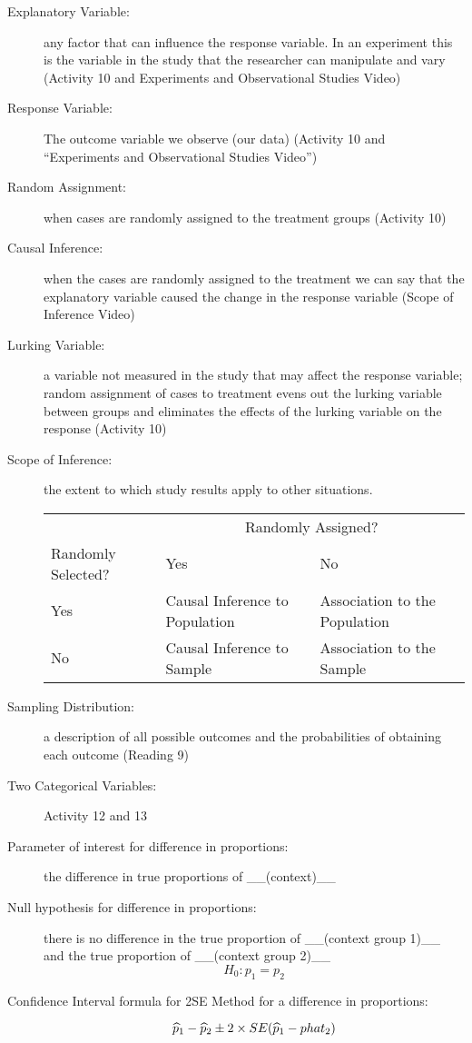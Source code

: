 \begin{description}
\item [Explanatory Variable:] any factor that can influence the
  response variable.  In an experiment this is the variable in the
  study that the researcher can manipulate and vary (Activity 10 and
  Experiments and Observational Studies Video)
\item [Response Variable:] The outcome variable we observe (our data)
  (Activity 10 and ``Experiments and Observational Studies Video'')
\item [Random Assignment:] when cases are randomly assigned to the
  treatment groups (Activity 10)
\item [Causal Inference:] when the cases are randomly assigned to the
  treatment we can say that the explanatory variable caused the change
  in the response variable (Scope of Inference Video)
\item [Lurking Variable:] a variable not measured in the study that
  may affect the response variable; random assignment of cases to
  treatment evens out the lurking variable between groups and
  eliminates the effects of the lurking variable on the response
  (Activity 10)
\item [Scope of Inference:] the extent to which study results apply to
  other situations. \\
  \begin{tabular}{|l|l|l|}
    & \multicolumn{2}{|c|}{Randomly Assigned?} \\ 
Randomly Selected?& Yes& No\\ \hline
 Yes              & Causal Inference to Population & Association to
 the Population\\ \hline
No &    Causal Inference to Sample & Association to
 the Sample\\ \hline
\end{tabular}
\item [Sampling Distribution:] a description of all possible outcomes
  and the probabilities of obtaining each outcome (Reading 9)
\item [Two Categorical Variables:] Activity 12 and 13\\

  \item [Parameter of interest for difference in proportions:] the
    difference in true proportions of \_\_(context)\_\_
  \item [Null hypothesis for difference in proportions:] there is no
    difference in the true proportion of  \_\_(context group 1)\_\_  and the
    true proportion of   \_\_(context group 2)\_\_ $$ H_0: p_1 = p_2$$
  \item [Confidence Interval formula for 2SE Method for a difference
    in proportions:] $$\widehat{p}_1 - \widehat{p}_2 \pm 2 \times SE(\widehat{p}_1 - phat_2)$$


\end{description}
